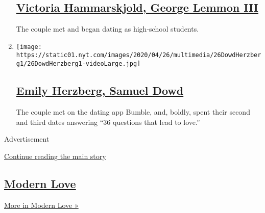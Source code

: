 \begin{enumerate}
{  \subsection{\texorpdfstring{\href{/2020/05/10/fashion/weddings/victoria-hammarskjold-george-lemmon-iii.html}{Victoria
  Hammarskjold, George Lemmon
  III}}{Victoria Hammarskjold, George Lemmon III}}\label{victoria-hammarskjold-george-lemmon-iii}}

  The couple met and began dating as high-school students.
\item
  \texttt{[image: https://static01.nyt.com/images/2020/04/26/multimedia/26DowdHerzberg1/26DowdHerzberg1-videoLarge.jpg]}

  \hypertarget{emily-herzberg-samuel-dowd}{%
  \subsection{\texorpdfstring{\href{/2020/04/26/fashion/weddings/emily-herzberg-samuel-dowd.html}{Emily
  Herzberg, Samuel
  Dowd}}{Emily Herzberg, Samuel Dowd}}\label{emily-herzberg-samuel-dowd}}

  The couple met on the dating app Bumble, and, boldly, spent their
  second and third dates answering ``36 questions that lead to love.''
\end{enumerate}

Advertisement

\protect\hyperlink{after-mid4}{Continue reading the main story}

\hypertarget{modern-love-1}{%
\subsection{\texorpdfstring{\href{/column/modern-love}{Modern
Love}}{Modern Love}}\label{modern-love-1}}

\href{/column/modern-love}{More in Modern Love »}

